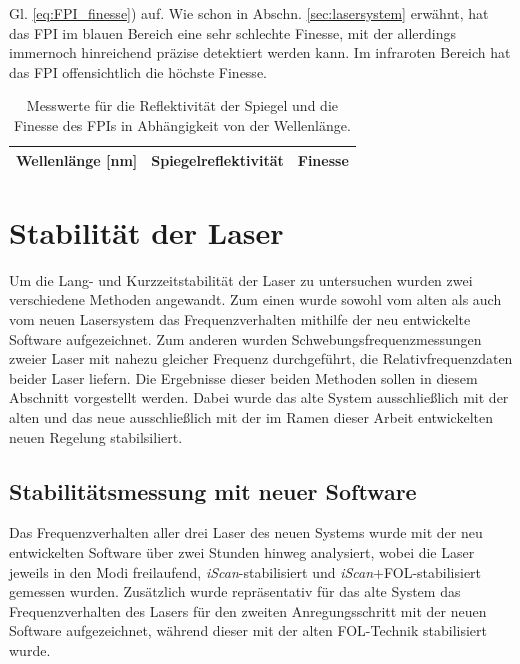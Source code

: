 Gl. \eqref{eq:FPI_finesse}) auf. Wie schon in Abschn. \ref{sec:lasersystem}
erwähnt, hat das FPI im blauen Bereich eine sehr schlechte Finesse, mit der allerdings immernoch hinreichend präzise detektiert werden kann. Im infraroten
Bereich hat das FPI offensichtlich die höchste Finesse.
\begin{table}[h]
	\begin{tabular}{ccc}
		\toprule
		\multicolumn{1}{C{0.30\textwidth}}{Wellenlänge [nm]} &
		\multicolumn{1}{C{0.31\textwidth}}{Spiegelreflektivität} &
		\multicolumn{1}{C{0.30\textwidth}}{Finesse}\\
		\midrule[1px]
		\hline
		
		\bottomrule[1px]
	\end{tabular}
	\caption[FPI Finesse]{Messwerte für die Reflektivität der
	Spiegel und die Finesse des FPIs in Abhängigkeit von der Wellenlänge.}
	\label{tab:finesse}
\end{table}

\section{Stabilität der Laser}\label{sec:stabilitaet_der_laser}
Um die Lang- und Kurzzeitstabilität der Laser zu untersuchen wurden zwei
verschiedene Methoden angewandt. Zum einen wurde sowohl vom alten als auch vom
neuen Lasersystem das Frequenzverhalten mithilfe der neu entwickelte Software
aufgezeichnet. Zum anderen wurden Schwebungsfrequenzmessungen zweier Laser mit
nahezu gleicher Frequenz durchgeführt, die Relativfrequenzdaten beider Laser
liefern. Die Ergebnisse dieser beiden Methoden sollen in diesem Abschnitt
vorgestellt werden. Dabei wurde das alte System ausschließlich mit der alten und
das neue ausschließlich mit der im Ramen dieser Arbeit entwickelten
neuen Regelung stabilsiliert.

\subsection{Stabilitätsmessung mit neuer
Software}\label{sec:stabilitaetsmessungen_software} Das Frequenzverhalten
aller drei Laser des neuen Systems wurde mit der neu entwickelten Software über zwei Stunden hinweg analysiert, wobei die
Laser jeweils in den Modi freilaufend, \textit{iScan}-stabilisiert und
\textit{iScan}+FOL-stabilisiert gemessen wurden. Zusätzlich wurde repräsentativ
für das alte System das Frequenzverhalten des Lasers für den zweiten
Anregungsschritt mit der neuen Software aufgezeichnet, während dieser
mit der alten FOL-Technik stabilisiert wurde.

